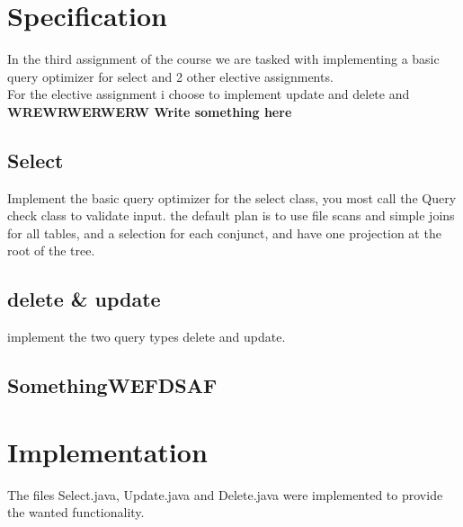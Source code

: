 \documentclass[a4paper,10pt,titlepage]{report}
\begin{document}
\section{Specification}
In the third assignment of the course we are tasked with implementing a basic query optimizer for select and 2 other elective assignments.\\

For the elective assignment i choose to implement update and delete and \textbf{WREWRWERWERW Write something here}


\subsection{Select}
Implement the basic query optimizer for the select class, you most call the Query check class to validate input. the default plan is to use file scans and simple joins for all tables, and a selection for each conjunct, and have one projection at the root of the tree.

\subsection{delete \& update }

implement the two query types delete and update.

\subsection{SomethingWEFDSAF}



%

\section{Implementation}
The files \textsf{Select.java}, \textsf{Update.java} and \textsf{Delete.java} were implemented to provide the wanted functionality.
\end{document}
